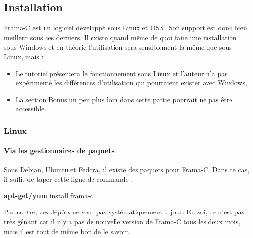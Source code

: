\documentclass[12pt,francais,]{scrbook}
\newenvironment{Shaded}{}{}
\newcommand{\KeywordTok}[1]{\textcolor[rgb]{0.00,0.44,0.13}{\textbf{{#1}}}}
\newcommand{\NormalTok}[1]{{#1}}
\newenvironment{zdsalertblock}[1]{%
  \tcolorbox[beamer,%
    noparskip,breakable,
    colback=LightCoral,colframe=DarkRed,%
    colbacklower=Tomato,%
    title=#1]
}{\endtcolorbox}
\begin{document}
\subsection{Installation}\label{installation}

Frama-C est un logiciel développé sous Linux et OSX. Son support est
donc bien meilleur sous ces derniers. Il existe quand même de quoi faire
une installation sous Windows et en théorie l'utilisation sera
sensiblement la même que sous Linux, mais :

\begin{zdsalertblock}{Attention}
  \begin{itemize}
  \item Le tutoriel présentera le
    fonctionnement sous Linux et l'auteur n'a pas expérimenté les
    différences d'utilisation qui pourraient exister avec
    Windows,
  \item La section \og{}Bonus\fg{} un peu plus loin dans cette
    partie pourrait ne pas être accessible.
  \end{itemize}
\end{zdsalertblock}

\clearpage

\subsubsection{Linux}\label{linux}

\paragraph{Via les gestionnaires de
paquets}\label{via-les-gestionnaires-de-paquets}

Sous Debian, Ubuntu et Fedora, il existe des paquets pour Frama-C. Dans
ce cas, il suffit de taper cette ligne de commande :

\begin{footnotesize}\begin{Shaded}
\begin{Highlighting}[]
\KeywordTok{apt-get/yum} \NormalTok{install frama-c}
\end{Highlighting}
\end{Shaded}\end{footnotesize}

Par contre, ces dépôts ne sont pas systématiquement à jour. En soi, ce
n'est pas très gênant car il n'y a pas de nouvelle version de Frama-C
tous les deux mois, mais il est tout de même bon de le savoir.
\end{document}
